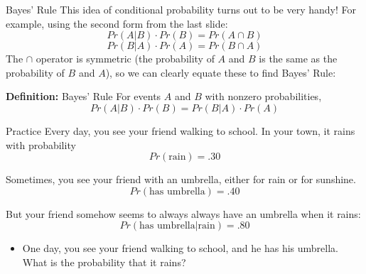 \documentclass{beamer}
\begin{document}
\begin{frame}{Bayes' Rule}
    This idea of conditional probability turns out to be very handy! For example, using the second form from the last slide:
    \[ Pr(A|B) \cdot Pr(B) = Pr(A \cap B) \]
    \[ Pr(B|A) \cdot Pr(A) = Pr(B \cap A) \]
    The $\cap$ operator is symmetric (the probability of $A$ and $B$ is the same as the probability of $B$ and $A$), so we can clearly equate these to find \alert{Bayes' Rule}: \vspace{2mm}
    
    \textbf{Definition:} Bayes' Rule\newline
    For events $A$ and $B$ with nonzero probabilities, 
    \[ Pr(A|B) \cdot Pr(B) = Pr(B|A) \cdot Pr(A) \]
\end{frame}

\begin{frame}{Practice}
    Every day, you see your friend walking to school. In your town, it rains with probability \[Pr(\text{rain}) = .30\] 
    
    Sometimes, you see your friend with an umbrella, either for rain or for sunshine.
    \[ Pr(\text{has umbrella}) = .40 \]
    
    But your friend somehow seems to always always have an umbrella when it rains:
    \[ Pr(\text{has umbrella} | \text{rain}) = .80\]
    
    \begin{itemize}
        \item One day, you see your friend walking to school, and he has his umbrella. What is the probability that it rains? 
    \end{itemize}
\end{frame}
\end{document}
